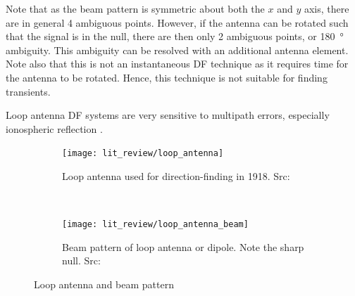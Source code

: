 Note that as the beam pattern is symmetric about both the \(x\) and \(y\) axis, there are in general 4 ambiguous points. However, if the antenna can be rotated such that the signal is in the null, there are then only 2 ambiguous points, or \SI{180}{\degree} ambiguity. This ambiguity can be resolved with an  additional antenna element. Note also that this is not an instantaneous DF technique as it requires time for the antenna to be rotated. Hence, this technique is not suitable for finding transients. 

Loop antenna DF systems are very sensitive to multipath errors, especially ionospheric reflection \cite{jenkins1991smallaperture}. 
\begin{figure}
  \centering
  \begin{subfigure}[b]{0.48\textwidth}
    \centering
    \texttt{[image: lit\_review/loop\_antenna]}
    \caption{Loop antenna used for direction-finding in 1918. Src: \cite{grabau1989funkpeiltechnik}}
  \end{subfigure}
  ~
  \begin{subfigure}[b]{0.48\textwidth}
    \centering
   \texttt{[image: lit\_review/loop\_antenna\_beam]}
   \caption{Beam pattern of loop antenna or dipole. Note the sharp null. Src: \cite{jenkins1991smallaperture}}
  \end{subfigure}
  \caption{Loop antenna and beam pattern}
  \label{fig:lit_loop_antenna}
\end{figure}

